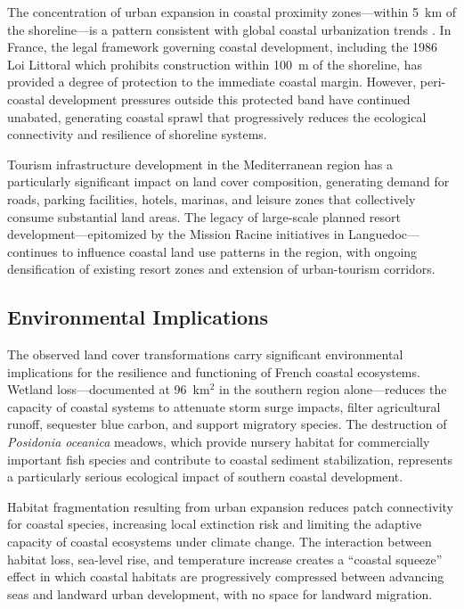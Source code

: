 \documentclass[coasts,article,submit,pdftex,moreauthors]{Definitions/mdpi}
\begin{document}
The concentration of urban expansion in coastal proximity zones—within 5~km of the shoreline—is a pattern consistent with global coastal urbanization trends \citep{FutureUrban2020}. In France, the legal framework governing coastal development, including the 1986 Loi Littoral which prohibits construction within 100~m of the shoreline, has provided a degree of protection to the immediate coastal margin. However, peri-coastal development pressures outside this protected band have continued unabated, generating coastal sprawl that progressively reduces the ecological connectivity and resilience of shoreline systems.

Tourism infrastructure development in the Mediterranean region has a particularly significant impact on land cover composition, generating demand for roads, parking facilities, hotels, marinas, and leisure zones that collectively consume substantial land areas. The legacy of large-scale planned resort development—epitomized by the Mission Racine initiatives in Languedoc—continues to influence coastal land use patterns in the region, with ongoing densification of existing resort zones and extension of urban-tourism corridors.

\subsection{Environmental Implications}

The observed land cover transformations carry significant environmental implications for the resilience and functioning of French coastal ecosystems. Wetland loss—documented at 96~km$^2$ in the southern region alone—reduces the capacity of coastal systems to attenuate storm surge impacts, filter agricultural runoff, sequester blue carbon, and support migratory species. The destruction of \textit{Posidonia oceanica} meadows, which provide nursery habitat for commercially important fish species and contribute to coastal sediment stabilization, represents a particularly serious ecological impact of southern coastal development.

Habitat fragmentation resulting from urban expansion reduces patch connectivity for coastal species, increasing local extinction risk and limiting the adaptive capacity of coastal ecosystems under climate change. The interaction between habitat loss, sea-level rise, and temperature increase creates a ``coastal squeeze'' effect in which coastal habitats are progressively compressed between advancing seas and landward urban development, with no space for landward migration.
\end{document}
